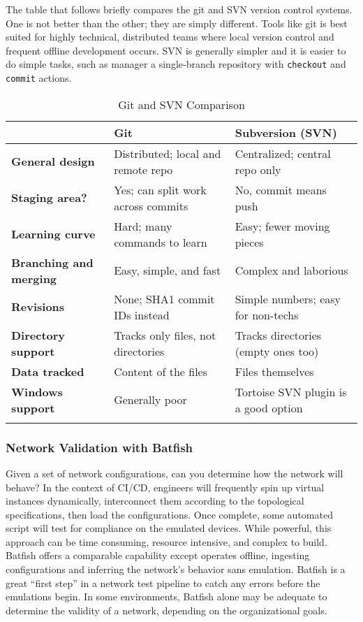 The table that follows briefly compares the git and SVN version control
systems. One is not better than the other; they are simply different. Tools
like git is best suited for highly technical, distributed teams where local
version control and frequent offline development occurs. SVN is generally
simpler and it is easier to do simple tasks, such as manager a single-branch
repository with \verb|checkout| and \verb|commit| actions.

\begin{longtable}{lll}
\toprule
&
\textbf{Git}
&
\textbf{Subversion (SVN)}
\\ \midrule
\textbf{General design}
&
Distributed; local and remote repo
&
Centralized; central repo only
\\ \midrule
\textbf{Staging area?}
&
Yes; can split work across commits
&
No, commit means push
\\ \midrule
\textbf{Learning curve}
&
Hard; many commands to learn
&
Easy; fewer moving pieces
\\ \midrule
\textbf{Branching and merging}
&
Easy, simple, and fast
&
Complex and laborious
\\ \midrule
\textbf{Revisions}
&
None; SHA1 commit IDs instead
&
Simple numbers; easy for non-techs
\\ \midrule
\textbf{Directory support}
&
Tracks only files, not directories
&
Tracks directories (empty ones too)
\\ \midrule
\textbf{Data tracked}
&
Content of the files
&
Files themselves
\\ \midrule
\textbf{Windows support}
&
Generally poor
&
Tortoise SVN plugin is a good option
\\
\bottomrule
\caption{Git and SVN Comparison}
\end{longtable}

\subsubsection{Network Validation with Batfish}
Given a set of network configurations, can you determine how the network
will behave? In the context of CI/CD, engineers will frequently spin up
virtual instances dynamically, interconnect them according to the topological
specifications, then load the configurations. Once complete, some automated
script will test for compliance on the emulated devices. While powerful, this
approach can be time consuming, resource intensive, and complex to build.
Batfish offers a comparable capability except operates offline, ingesting
configurations and inferring the network's behavior sans emulation. Batfish
is a great ``first step'' in a network test pipeline to catch any errors before
the emulations begin. In some environments, Batfish alone may be adequate to
determine the validity of a network, depending on the organizational goals.

